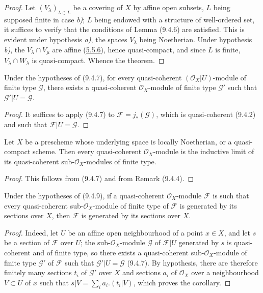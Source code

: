 
\begin{proof}
Let $(V_\lambda)_{\lambda\in L}$ be a covering of $X$ by affine open
subsets, $L$ being supposed finite in case \emph{b)}; $L$ being endowed with a
structure of well-ordered set, it suffices to verify that the conditions
of Lemma (9.4.6) are satisfied. This is evident under hypothesis \emph{a)}, the
spaces $V_\lambda$ being Noetherian. Under hypothesis \emph{b)}, the
$V_\lambda\cap V_\mu$ are affine (\hyperref[I.5.5.6]{5.5.6}), hence
quasi-compact, and since $L$ is finite, $V_\lambda\cap W_\lambda$ is
quasi-compact. Whence the theorem.
\end{proof}

\begin{corollary}[9.4.8]
\label{I.9.4.8}
Under the hypotheses of (9.4.7), for every quasi-coherent
$(\mathscr{O}_X|U)$-module of finite type $\mathscr{G}$, there exists a
quasi-coherent $\mathscr{O}_X$-module of finite type $\mathscr{G}'$ such
that $\mathscr{G}'|U=\mathscr{G}$.
\end{corollary}

\begin{proof}
It suffices to apply (9.4.7) to $\mathscr{F}=j_*(\mathscr{G})$, which is
quasi-coherent (9.4.2) and such that $\mathscr{F}|U=\mathscr{G}$.
\end{proof}

\begin{corollary}[9.4.9]
\label{I.9.4.9}
Let $X$ be a prescheme whose underlying space is locally Noetherian, or
a quasi-compact scheme. Then every quasi-coherent $\mathscr{O}_X$-module is
the inductive limit of its quasi-coherent sub-$\mathscr{O}_X$-modules of
finite type.
\end{corollary}

\begin{proof}
This follows from (9.4.7) and from Remark (9.4.4).
\end{proof}

\begin{corollary}[9.4.10]
\label{I.9.4.10}
Under the hypotheses of (9.4.9), if a quasi-coherent $\mathscr{O}_X$-module
$\mathscr{F}$ is such that every quasi-coherent sub-$\mathscr{O}_X$-module
of finite type of $\mathscr{F}$ is generated by its sections over $X$,
then $\mathscr{F}$ is generated by its sections over $X$.
\end{corollary}

\begin{proof}
Indeed, let $U$ be an affine open neighbourhood of a point $x\in X$, and let
$s$ be a section of $\mathscr{F}$ over $U$; the
sub-$\mathscr{O}_X$-module $\mathscr{G}$ of $\mathscr{F}|U$ generated by
$s$ is quasi-coherent and of finite type, so there exists a
quasi-coherent sub-$\mathscr{O}_X$-module of finite type $\mathscr{G}'$ of
$\mathscr{F}$ such that $\mathscr{G}'|U=\mathscr{G}$ (9.4.7). By hypothesis,
there are therefore finitely many sections $t_i$ of $\mathscr{G}'$ over
$X$ and sections $a_i$ of $\mathscr{O}_X$ over a neighbourhood
$V\subset U$ of $x$ such that
$s|V=\sum_i a_i.(t_i|V)$, which proves the corollary.
\end{proof}


